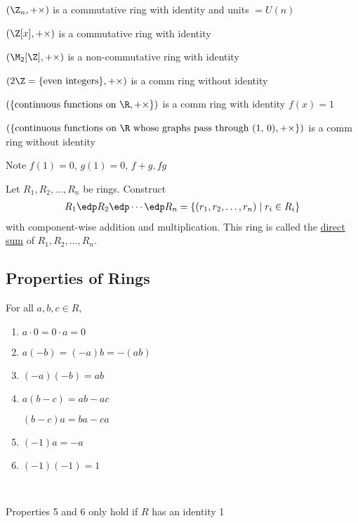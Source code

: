 \begin{example}
  \((\Z_n, +\times)\) is a commutative ring with identity and units \(=U(n)\)
\end{example}

\begin{example}
  \((\Z[x], +\times)\) is a commutative ring with identity
\end{example}

\begin{example}
  \((\M_2[\Z], +\times)\) is a non-commutative ring with identity
\end{example}

\begin{example}
  \((2\Z = \{\text{even integers}\}, +\times)\) is a comm ring without identity
\end{example}

\begin{example}
  \((\{\text{continuous functions on \R}, +\times\})\) is a comm ring with identity \(f(x) = 1\)
\end{example}

\begin{example}
  \((\{\text{continuous functions on \R\ whose graphs pass through (1, 0)}, +\times\})\) is a comm ring without identity

  Note \(f(1) = 0\), \(g(1) = 0\), \(f+g, fg\)
\end{example}

\begin{example}
  Let \(R_1, R_2, \ldots, R_n\) be rings. Construct
  \begin{align*}
    R_1\edp R_2\edp \cdots \edp R_n = \{(r_1, r_2, \ldots, r_n) \mid r_i\in R_i\}
  \end{align*}
  with component-wise addition and multiplication. This ring is called the \ul{direct sum} of \(R_1, R_2, \ldots, R_n\).
\end{example}

\subsection{Properties of Rings}

\begin{theorem}
  For all \(a,b,c\in R\),
\begin{enumerate}
  \item \(a\cdot 0 = 0\cdot a = 0\)
  \item \(a(-b) = (-a)b = -(ab)\)
  \item \((-a)(-b)=ab\)
  \item \(a(b-c) = ab-ac\)

  \((b-c)a = ba-ca\)
  \item \((-1)a = -a\)
  \item \((-1)(-1) = 1\)
\end{enumerate}\

\begin{note}
Properties 5 and 6 only hold if \(R\) has an identity 1
\end{note}
\end{theorem}

